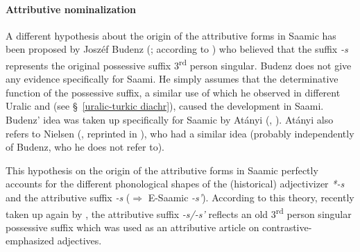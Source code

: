 {\paragraph{Attributive nominalization}
A different hypothesis about the origin of the attributive forms in Saamic has been proposed by Joszéf Budenz (\citeyear{budenz1870}; according to \citealt{atanyi1942,atanyi1943}) who believed that the suffix \textit{-s} represents the original possessive suffix 3\textsuperscript{rd} person singular. Budenz does not give any evidence specifically for Saami. He simply assumes that the determinative function of the possessive suffix, a similar use of which he observed in different Uralic and  (see \S~\ref{uralic-turkic diachr}), caused the development in Saami. Budenz' idea was taken up specifically for Saamic by Atányi (\citeyear{atanyi1942}, \citeyear{atanyi1943}). Atányi also refers to Nielsen (\citeyear{nielsen1933}, reprinted in \citealt{nielsen1945b}), who had a similar idea (probably independently of Budenz, who he does not refer to).

This hypothesis on the origin of the attributive forms in Saamic perfectly accounts for the different phonological shapes of the (historical) adjectivizer \mbox{\textit{*-s}} and the attributive suffix \textit{-s} ($\Rightarrow$ E-Saamic \textit{-s'}). According to this theory, recently taken up again by \cite{riesler2006b}, the attributive suffix \textit{-s/-s'} reflects an old 3\textsuperscript{rd} person singular possessive suffix which was used as an attributive article on contrastive-emphasized adjectives.

}
